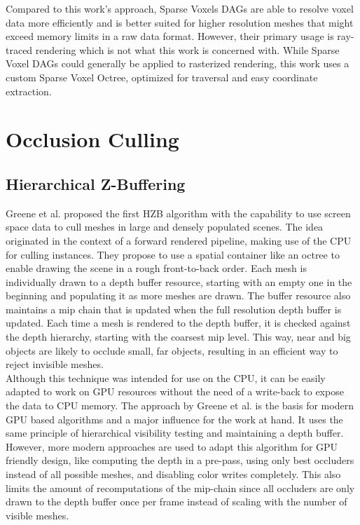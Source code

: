 \noindent
Compared to this work's approach, Sparse Voxels \ac{DAG}s are able to resolve voxel data more efficiently and is 
better suited for higher resolution meshes that might exceed memory limits in a raw data format. However, their 
primary usage is ray-traced rendering which is not what this work is concerned with. While Sparse Voxel \ac{DAG}s 
could generally be applied to rasterized rendering, this work uses a custom Sparse Voxel Octree, optimized for 
traversal and easy coordinate extraction. 


\section{Occlusion Culling}


\subsection*{Hierarchical Z-Buffering}

Greene et al. \cite{Greene93,Greene95} proposed the first \ac{HZB} algorithm with the capability to use screen space 
data to cull meshes in large and densely populated scenes. The idea originated in the context of a forward rendered 
pipeline, making use of the \ac{CPU} for culling instances. They propose to use a spatial container like an octree to 
enable drawing the scene in a rough front-to-back order. Each mesh is individually drawn to a depth buffer resource, 
starting with an empty one in the beginning and populating it as more meshes are drawn. The buffer resource also 
maintains a mip chain that is updated when the full resolution depth buffer is updated. Each time a mesh is rendered 
to the depth buffer, it is checked against the depth hierarchy, starting with the coarsest mip level. This way, near 
and big objects are likely to occlude small, far objects, resulting in an efficient way to reject invisible meshes.\\

\noindent
Although this technique was intended for use on the \ac{CPU}, it can be easily adapted to work on \ac{GPU} resources 
without the need of a write-back to expose the data to \ac{CPU} memory. The approach by Greene et al. is the basis for 
modern \ac{GPU} based algorithms and a major influence for the work at hand. It uses the same principle of hierarchical 
visibility testing and maintaining a depth buffer. \\

\noindent
However, more modern approaches are used to adapt this algorithm for \ac{GPU} friendly design, like computing the depth 
in a pre-pass, using only best occluders instead of all possible meshes, and disabling color writes completely. This also 
limits the amount of recomputations of the mip-chain since all occluders are only drawn to the depth buffer once per 
frame instead of scaling with the number of visible meshes.

